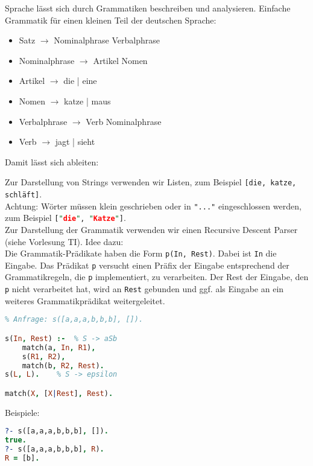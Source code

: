 Sprache lässt sich durch Grammatiken beschreiben und analysieren. Einfache Grammatik für einen kleinen Teil der deutschen Sprache:
\begin{itemize}
\item Satz $\to$ Nominalphrase Verbalphrase
\item Nominalphrase $\to$ Artikel Nomen
\item Artikel $\to$ die | eine
\item Nomen $\to$ katze | maus
\item Verbalphrase $\to$ Verb Nominalphrase
\item Verb $\to$ jagt | sieht
\end{itemize}
Damit lässt sich ableiten:
\begin{center}
\end{center}
Zur Darstellung von Strings verwenden wir Listen, zum Beispiel \lstinline$[die, katze, schläft]$.\\
Achtung: Wörter müssen klein geschrieben oder in \lstinline$"..."$ eingeschlossen werden, zum Beispiel \lstinline[language=Prolog]|["die", "Katze"]|.\\
Zur Darstellung der Grammatik verwenden wir einen Recursive Descent Parser (siehe Vorlesung TI). Idee dazu:\\
Die Grammatik-Prädikate haben die Form \lstinline$p(In, Rest)$. Dabei ist \lstinline$In$ die Eingabe. Das Prädikat \lstinline$p$ versucht einen Präfix der Eingabe entsprechend der Grammatikregeln, die \lstinline$p$ implementiert, zu verarbeiten. Der Rest der Eingabe, den \lstinline$p$ nicht verarbeitet hat, wird an \lstinline$Rest$ gebunden und ggf. als Eingabe an ein weiteres Grammatikprädikat weitergeleitet.
 $ $
\begin{lstlisting}[language=Prolog]
% Recursive Descent Parser für L = {a^n b^n | n >= 0  }
% Anfrage: s([a,a,a,b,b,b], []).

s(In, Rest) :-	% S -> aSb
	match(a, In, R1), 
	s(R1, R2),
	match(b, R2, Rest).
s(L, L).	% S -> epsilon

match(X, [X|Rest], Rest).
\end{lstlisting}
Beispiele:
\begin{lstlisting}[language=Prolog]
?- s([a,a,a,b,b,b], []).
true.
?- s([a,a,a,b,b,b], R). 
R = [b].
\end{lstlisting}

